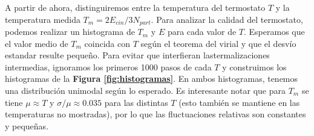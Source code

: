\documentclass[twoside, 12pt]{article}
\begin{document}
A partir de ahora, distinguiremos entre la temperatura del termostato $T$ y la temperatura medida $T_m = 2E_{cin}/3N_{part}$. 
Para analizar la calidad del termostato, podemos realizar un histograma de $T_m$ y $E$ para cada valor de $T$. Esperamos que el valor medio de $T_m$ coincida con $T$ según el teorema del virial 
y que el desvío estandar resulte pequeño.
Para evitar que interfieran lastermalizaciones intermedias, ignoramos los primeros 1000 pasos de cada $T$ y construimos los histogramas de la \textbf{Figura \ref{fig:histogramas}}. 
En ambos histogramas, tenemos una distribución unimodal según lo esperado. Es interesante notar que para $T_m$ se tiene $\mu\approx T$ y $\sigma/\mu \approx 0.035$ para las distintas $T$ (esto también se 
mantiene en las temperaturas no mostradas), por lo que las fluctuaciones relativas son constantes y pequeñas. 
\end{document}
